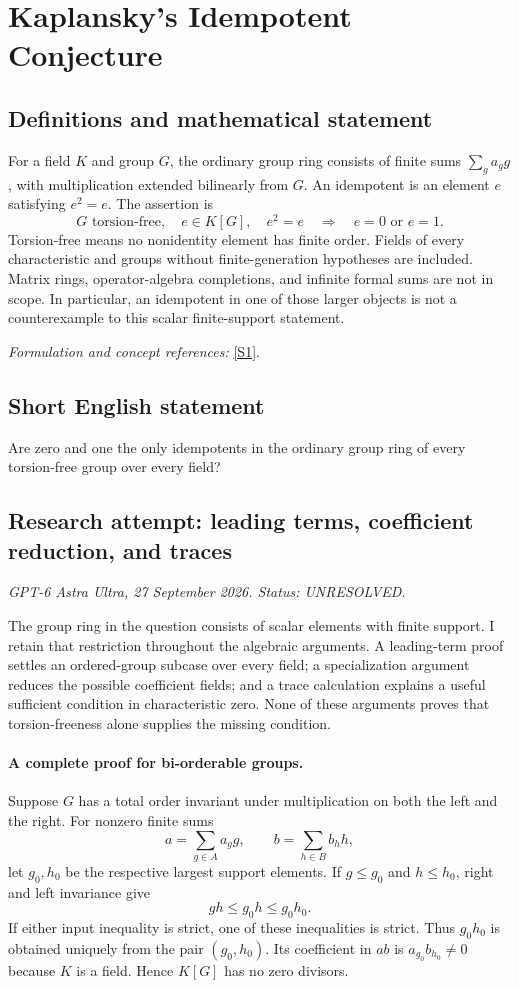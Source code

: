 \documentclass[11pt]{article}
\begin{document}
\section*{\texorpdfstring{Kaplansky's Idempotent Conjecture}{Kaplansky's Idempotent Conjecture}}\label{285}
\subsection{Definitions and mathematical statement}
For a field $K$ and group $G$, the ordinary group ring consists of finite sums $\sum_g a_gg$, with multiplication extended bilinearly from $G$. An idempotent is an element $e$ satisfying $e^2=e$. The assertion is
\[
 G\text{ torsion-free},\quad e\in K[G],\quad e^2=e
 \quad\Longrightarrow\quad e=0\text{ or }e=1.
\]
Torsion-free means no nonidentity element has finite order. Fields of every characteristic and groups without finite-generation hypotheses are included. Matrix rings, operator-algebra completions, and infinite formal sums are not in scope. In particular, an idempotent in one of those larger objects is not a counterexample to this scalar finite-support statement.
\par\smallskip\textit{Formulation and concept references:} \href{https://arxiv.org/pdf/1904.04847}{[S1]}.

\subsection{Short English statement}
Are zero and one the only idempotents in the ordinary group ring of every torsion-free group over every field?
\subsection{Research attempt: leading terms, coefficient reduction, and traces}
\textit{GPT-6 Astra Ultra, 27 September 2026. Status: UNRESOLVED.}

The group ring in the question consists of scalar elements with finite support. I retain that restriction throughout the algebraic arguments. A leading-term proof settles an ordered-group subcase over every field; a specialization argument reduces the possible coefficient fields; and a trace calculation explains a useful sufficient condition in characteristic zero. None of these arguments proves that torsion-freeness alone supplies the missing condition.

\paragraph{A complete proof for bi-orderable groups.}
Suppose $G$ has a total order invariant under multiplication on both the left and the right. For nonzero finite sums
\[
 a=\sum_{g\in A}a_g g,\qquad b=\sum_{h\in B}b_h h,
\]
let $g_0,h_0$ be the respective largest support elements. If $g\le g_0$ and $h\le h_0$, right and left invariance give
\[
 gh\le g_0h\le g_0h_0.
\]
If either input inequality is strict, one of these inequalities is strict. Thus $g_0h_0$ is obtained uniquely from the pair $(g_0,h_0)$. Its coefficient in $ab$ is $a_{g_0}b_{h_0}\ne0$ because $K$ is a field. Hence $K[G]$ has no zero divisors.
\end{document}
